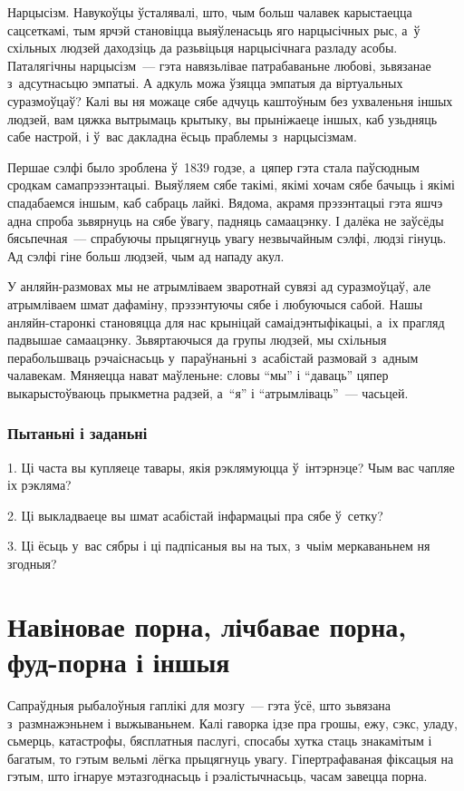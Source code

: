 Нарцысізм. Навукоўцы ўсталявалі, што, чым больш чалавек карыстаецца сацсеткамі, тым ярчэй становіцца выяўленасьць яго нарцысічных рыс, а~ў схільных людзей даходзіць да разьвіцьця нарцысічнага разладу асобы. Паталягічны нарцысізм~--- гэта навязьлівае патрабаваньне любові, зьвязанае з~адсутнасьцю эмпатыі. А адкуль можа ўзяцца эмпатыя да віртуальных суразмоўцаў? Калі вы ня можаце сябе адчуць каштоўным без ухваленьня іншых людзей, вам цяжка вытрымаць крытыку, вы прыніжаеце іншых, каб узьдняць сабе настрой, і ў~вас дакладна ёсьць праблемы з~нарцысізмам.

Першае сэлфі было зроблена ў~1839 годзе, а~цяпер гэта стала паўсюдным сродкам самапрэзэнтацыі. Выяўляем сябе такімі, якімі хочам сябе бачыць і якімі спадабаемся іншым, каб сабраць лайкі. Вядома, акрамя прэзэнтацыі гэта яшчэ адна спроба зьвярнуць на сябе ўвагу, падняць самаацэнку. І далёка не заўсёды бясьпечная~--- спрабуючы прыцягнуць увагу незвычайным сэлфі, людзі гінуць. Ад сэлфі гіне больш людзей, чым ад нападу акул.

У анляйн-размовах мы не атрымліваем зваротнай сувязі ад суразмоўцаў, але атрымліваем шмат дафаміну, прэзэнтуючы сябе і любуючыся сабой. Нашы анляйн-старонкі становяцца для нас крыніцай самаідэнтыфікацыі, а~іх прагляд падвышае самаацэнку. Зьвяртаючыся да групы людзей, мы схільныя перабольшваць рэчаіснасьць у~параўнаньні з~асабістай размовай з~адным чалавекам. Мяняецца нават маўленьне: словы ``мы'' і ``даваць'' цяпер выкарыстоўваюць прыкметна радзей, а~``я'' і ``атрымліваць''~--- часьцей.

\subsubsection{Пытаньні і заданьні}

1. Ці часта вы купляеце тавары, якія рэклямуюцца ў~інтэрнэце? Чым вас чапляе іх рэкляма?

2. Ці выкладваеце вы шмат асабістай інфармацыі пра сябе ў~сетку?

3. Ці ёсьць у~вас сябры і ці падпісаныя вы на тых, з~чыім меркаваньнем ня згодныя?


\section{Навіновае порна, лічбавае порна, фуд-порна і іншыя}

Сапраўдныя рыбалоўныя гаплікі для мозгу~--- гэта ўсё, што зьвязана з~размнажэньнем і выжываньнем. Калі гаворка ідзе пра грошы, ежу, сэкс, уладу, сьмерць, катастрофы, бясплатныя паслугі, спосабы хутка стаць знакамітым і багатым, то гэтым вельмі лёгка прыцягнуць увагу. Гіпертрафаваная фіксацыя на гэтым, што ігнаруе мэтазгоднасьць і рэалістычнасьць, часам завецца порна.

